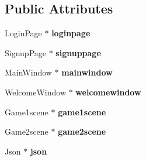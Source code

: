 \subsection*{Public Attributes}
\begin{DoxyCompactItemize}
\item 
\hypertarget{classMainGView_a2e609689280cf1f607dad15de61e1475}{Login\-Page $\ast$ {\bfseries loginpage}}\label{classMainGView_a2e609689280cf1f607dad15de61e1475}

\item 
\hypertarget{classMainGView_ae8182e41243303ecec1e48a3aa1d9e38}{Signup\-Page $\ast$ {\bfseries signuppage}}\label{classMainGView_ae8182e41243303ecec1e48a3aa1d9e38}

\item 
\hypertarget{classMainGView_ac4616aadc46c721445aa42dc8b3cb5ba}{Main\-Window $\ast$ {\bfseries mainwindow}}\label{classMainGView_ac4616aadc46c721445aa42dc8b3cb5ba}

\item 
\hypertarget{classMainGView_a36f82fd444417446dcd22f0a2adc6ed1}{Welcome\-Window $\ast$ {\bfseries welcomewindow}}\label{classMainGView_a36f82fd444417446dcd22f0a2adc6ed1}

\item 
\hypertarget{classMainGView_aa2a7434264160bf111596b69546d3522}{Game1scene $\ast$ {\bfseries game1scene}}\label{classMainGView_aa2a7434264160bf111596b69546d3522}

\item 
\hypertarget{classMainGView_abac1e51786e0daab73c6adc73445e976}{Game2scene $\ast$ {\bfseries game2scene}}\label{classMainGView_abac1e51786e0daab73c6adc73445e976}

\item 
\hypertarget{classMainGView_af8c6dbae60e7ef7716ffcbd78301bfff}{Json $\ast$ {\bfseries json}}\label{classMainGView_af8c6dbae60e7ef7716ffcbd78301bfff}

\end{DoxyCompactItemize}


